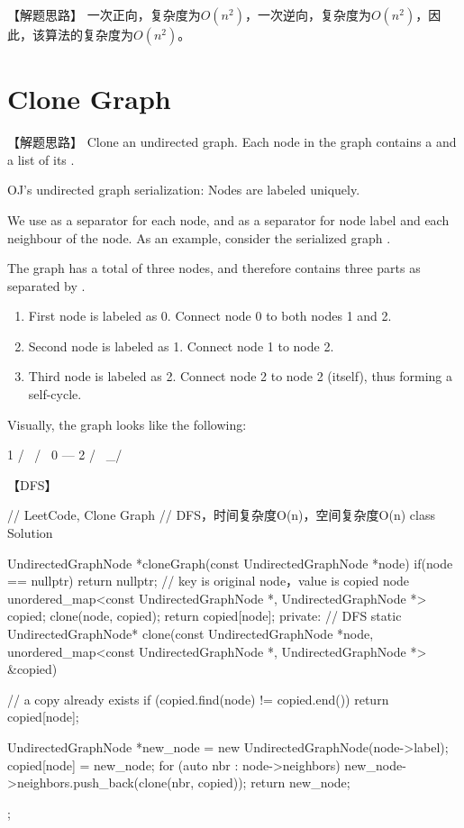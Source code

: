 【解题思路】
一次正向，复杂度为$O(n^2)$，一次逆向，复杂度为$O(n^2)$，因此，该算法的复杂度为$O(n^2)$。


\section{Clone Graph} %
\label{sec:clone-graph}


【解题思路】
Clone an undirected graph. Each node in the graph contains a  and a list of its .


OJ's undirected graph serialization:
Nodes are labeled uniquely.

We use \code{\#} as a separator for each node, and \code{,} as a separator for node label and each neighbour of the node.
As an example, consider the serialized graph .

The graph has a total of three nodes, and therefore contains three parts as separated by \code{\#}.
\begin{enumerate}
	\item First node is labeled as 0. Connect node 0 to both nodes 1 and 2.
	\item Second node is labeled as 1. Connect node 1 to node 2.
	\item Third node is labeled as 2. Connect node 2 to node 2 (itself), thus forming a self-cycle.
\end{enumerate}

Visually, the graph looks like the following:
\begin{Code}
	1
	/ \
	/   \
	0 --- 2
	/ \
	\_/
\end{Code}


【DFS】
\begin{Code}
	// LeetCode, Clone Graph
	// DFS，时间复杂度O(n)，空间复杂度O(n)
	class Solution {
		UndirectedGraphNode *cloneGraph(const UndirectedGraphNode *node) {
			if(node == nullptr) return nullptr;
			// key is original node，value is copied node
			unordered_map<const UndirectedGraphNode *,
			UndirectedGraphNode *> copied;
			clone(node, copied);
			return copied[node];
		}
		private:
		// DFS
		static UndirectedGraphNode* clone(const UndirectedGraphNode *node,
		unordered_map<const UndirectedGraphNode *,
		UndirectedGraphNode *> &copied) {
			// a copy already exists
			if (copied.find(node) != copied.end()) return copied[node];
			
			UndirectedGraphNode *new_node = new UndirectedGraphNode(node->label);
			copied[node] = new_node;
			for (auto nbr : node->neighbors)
			new_node->neighbors.push_back(clone(nbr, copied));
			return new_node;
		}
	};
\end{Code}


